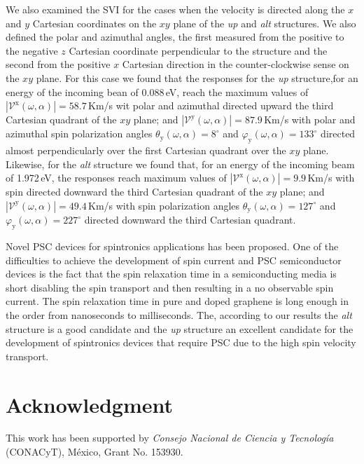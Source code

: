 \documentclass[prb,11pt,tightenlines,twocolumn,aps]{revtex4-1}
\begin{document}
We also examined the SVI for the cases when the velocity is directed along the
$x$ and $y$ Cartesian coordinates on the $xy$ plane of the \emph{up} and
\emph{alt} structures. We also defined the polar and azimuthal angles, the
first measured from the positive to the negative $z$ Cartesian coordinate
perpendicular to the structure and the second from the positive $x$ Cartesian
direction in the counter-clockwise sense on the $xy$ plane.
% 
For this case we found that the responses for the \emph{up} structure,for an
energy of the incoming bean of 0.088\,eV, reach the maximum values  of
$|\mathcal{V}^{\mathrm{x}}(\omega,\alpha)|=58.7$\,Km/s wit polar and azimuthal
directed upward the third Cartesian quadrant of the $xy$ plane; and
$|\mathcal{V}^{\mathrm{y}} (\omega,\alpha)|=87.9$\,Km/s with polar and
azimuthal spin polarization angles $\theta_{\mathrm{y}} (\omega,\alpha) =
8^{\circ}$ and $\varphi_{\mathrm{y}} (\omega,\alpha) = 133^{\circ}$ directed
almost perpendicularly over the first Cartesian quadrant over the $xy$ plane.
% 
Likewise, for the \emph{alt} structure we found that, for an energy of the
incoming beam of 1.972\,eV, the responses reach maximum values of
$|\mathcal{V}^{\mathrm{x}} (\omega,\alpha)| = 9.9$\,Km/s with spin
directed downward the third Cartesian quadrant of the $xy$ plane; and
$|\mathcal{V}^{\mathrm{y}} (\omega,\alpha)| = 49.4$\,Km/s with spin
polarization angles $\theta_{\mathrm{y}} (\omega,\alpha) = 127^{\circ}$ and
$\varphi_{\mathrm{y}} (\omega,\alpha)=227^{\circ}$ directed downward the third
Cartesian quadrant.

Novel PSC devices for spintronics applications has been
proposed.\cite{gotteNat16, pershinPRB08} One of the difficulties to achieve the
development of spin current and PSC semiconductor devices is the fact that the
spin relaxation time in a semiconducting media is short disabling the spin
transport and then resulting in a no observable spin
current.\cite{murakamiSc03}
% 
The spin relaxation time in pure and doped graphene is long enough in the order
from nanoseconds to milliseconds. \cite{wojtaszekPRB13,ertler2009electron} The,
according to our results the \emph{alt} structure is a good candidate and the
\emph{up} structure an excellent candidate for the development of spintronics
devices that require PSC due to the high spin velocity transport.

\section{Acknowledgment} %

This work has been supported by \emph{Consejo Nacional de Ciencia y
Tecnolog\'ia} (CONACyT), M\'exico, Grant No. 153930.



\end{document}
